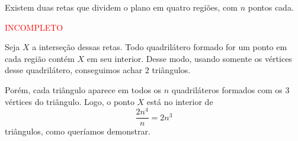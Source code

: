 \begin{lem*}
	Existem duas retas que dividem o plano em quatro regiões, com $n$ pontos cada.
\end{lem*}

\begin{dem}
	\textcolor{red}{INCOMPLETO}
\end{dem}

Seja $X$ a interseção dessas retas. Todo quadrilátero formado for um ponto em cada região contém $X$ em seu interior. Desse modo, usando somente os vértices desse quadrilátero, conseguimos achar $2$ triângulos.

Porém, cada triângulo aparece em todos os $n$ quadriláteros formados com os 3 vértices do triângulo. Logo, o ponto $X$ está no interior de
$$ \frac{2n^4}{n} = 2n^3$$
triângulos, como queríamos demonstrar.
